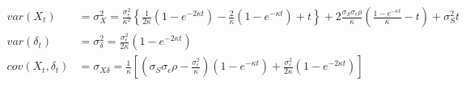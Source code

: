 \documentclass[a4paper,11pt]{article}
\newcommand{\sigmaS}{\sigma_S}
\newcommand{\sigmaE}{\sigma_\epsilon}
\begin{document}
\begin{appendix}
\begin{align}
  var(X_t) &= \sigma_X^2 = \frac{\sigmaE^2}{\kappa^2}
  \left\{\frac{1}{2\kappa}\left(1 - e^{-2\kappa t}\right) -
    \frac{2}{\kappa}\left(1 - e^{-\kappa t}\right) + t\right\} +
  2\frac{\sigmaS\sigmaE\rho}{\kappa} \left(\frac{1 - e^{-\kappa
        t}}{\kappa} - t\right) + \sigma^2_St \\
  var(\delta_t) &= \sigma_\delta^2 = \frac{\sigmaE^2}{2\kappa}\left(1 -
    e^{-2\kappa t}\right) \\
  cov(X_t, \delta_t) &= \sigma_{X\delta} = \frac{1}{\kappa}\left[\left(\sigmaS\sigmaE\rho -
      \frac{\sigmaE^2}{\kappa}\right)\left(1 - e^{-\kappa t}\right) +
    \frac{\sigmaE^2}{2\kappa}\left(1 - e^{-2\kappa t}\right)\right]
\end{align}
\end{appendix}

\end{document}
